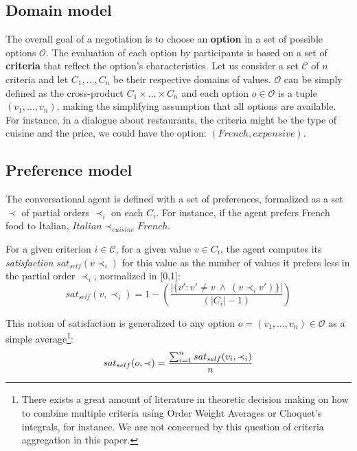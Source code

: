 \documentclass{llncs}
\begin{document}
		\subsection{Domain model}
		The overall goal of a negotiation is to choose an \textbf{option} in a set of possible options $\mathcal{O}$. The evaluation of each option by participants is based on a set of \textbf{criteria} that reflect the option's characteristics. Let us consider a set $\mathcal{C}$ of $n$ criteria and let $C_1,\ldots,C_n$ be their respective domains of values. $\mathcal{O}$ can be simply defined as the cross-product $C_1\times\ldots\times C_n$ and each option $o\in\mathcal{O}$ is a tuple $(v_1,\ldots,v_n)$, making the simplifying assumption that all options are available. For instance, in a dialogue about restaurants, the criteria might be the type of cuisine and the price, we could have the option: $(French,expensive)$.
		
		\subsection{Preference model} 
		The conversational agent is defined with a set of preferences, formalized as a set $\prec$ of partial orders $\prec_i$ on each $C_i$. For instance, if the agent prefers French food to Italian, $Italian\prec_{cuisine}French$.
		
		For a given criterion $i\in \mathcal{C}$, for a given value $v\in C_i$, the agent computes its \emph{satisfaction} $sat_{self}(v \prec_i)$ for this value as the number of values it prefers less in the partial order $\prec_i$, normalized in [0,1]:
		\vspace{-.5em} 
		\begin{equation}
		sat_{self}(v, \prec_i) =	1 - \left( \frac{|\{v' : v' \neq v \  \wedge \ (v \prec_i v')\}| }{( |C_i| - 1 )}\right)
		\end{equation}
		
		This notion of satisfaction is generalized to any option $o= (v_1, \ldots, v_n)\in \mathcal{O}$ as a simple average\footnote{There exists a great amount of literature in theoretic decision making on how to combine multiple criteria using Order Weight Averages or Choquet's integrals, for instance. We are not concerned by this question of criteria aggregation in this paper.}:
		\vspace{-1em} 
		\begin{equation}
		sat_{self}(o, \prec) = \frac{\sum_{i=1}^{n} sat_{self}(v_i, \prec_i) }{n}
		\vspace{-1.5em} 
		\end{equation}
		
\end{document}
